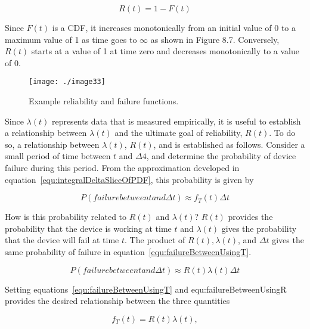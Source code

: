 \begin{equation}
\label{equ:integralDeltaSliceOfPDF}
R(t) = 1 - F(t)
\end{equation}


Since $F(t)$ is a CDF, it increases monotonically from an initial
value of 0 to a maximum value of 1 as time goes to $\infty$ as shown in Figure
8.7. Conversely, $R(t)$ starts at a value of 1 at time zero and
decreases monotonically to a value of 0.


\begin{figure}
\texttt{[image: ./image33]}
\caption{Example reliability and failure functions.}
\label{figure:reliabilityAndFailure}
\end{figure}

Since $\lambda(t)$ represents data that is measured empirically, it is
useful to establish a relationship between $\lambda(t)$ and the ultimate
goal of reliability, $R(t)$. To do so, a relationship between
$\lambda(t)$, $R(t)$, and  is
established as follows. Consider a small period of time between $t$
and $\Delta 4$, and determine the
probability of device failure during this period. From the approximation
developed in 
equation~\ref{equ:integralDeltaSliceOfPDF}, this probability is given by

\begin{equation}
\label{equ:failureBetweenUsingT}
P(failure between t and \Delta t) \approx f_T(t) \Delta t
\end{equation}

How is this probability related to $R(t)$ and $\lambda(t)$?
$R(t)$ provides the probability that the device is working at time $t$
and $\lambda(t)$ gives the probability that the device will fail
at time $t$. The product of $R(t), \lambda(t)$, and $\Delta t$ gives
the same probability of failure in equation~\ref{equ:failureBetweenUsingT}.

\begin{equation}
\label{equ:failureBetweenUsingR}
P(failure between t and \Delta t) \approx R(t) \lambda(t) \Delta t
\end{equation}

Setting equations~\ref{equ:failureBetweenUsingT} and  {equ:failureBetweenUsingR} 
provides the desired relationship between the three quantities

\begin{equation}
\label{equ:failureBetweenUsingR}
f_T(t) = R(t) \lambda(t) ,
\end{equation}

